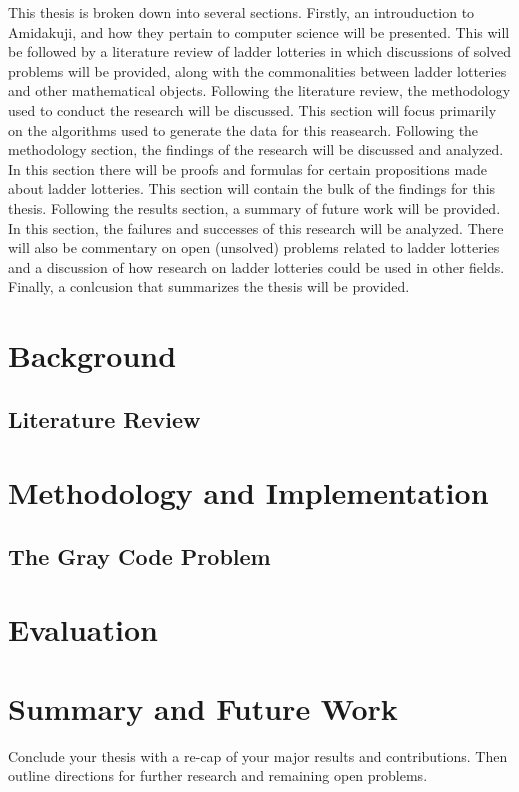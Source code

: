 This thesis is broken down into several sections. Firstly, an introuduction to Amidakuji, 
and how they pertain to computer science will be presented. This will be followed by a literature 
review of ladder lotteries in which discussions of solved problems will be 
provided, along with the commonalities between ladder lotteries and 
other mathematical objects. Following the literature review, the methodology
used to conduct the research will be discussed. This section will focus 
primarily on the algorithms used to generate the data for this reasearch. 
Following the methodology section, the findings of the research will be discussed and analyzed. 
In this section there will be proofs and formulas for certain propositions made about ladder 
lotteries. This section will contain the bulk of the findings for this thesis.
Following the results section, a summary of future work will be provided. In this section,
the failures and successes of this research will be analyzed. There will also be commentary on 
open (unsolved) problems related to ladder lotteries and a 
discussion of how research on ladder lotteries could be used in other fields.
Finally, a conlcusion that summarizes the thesis will be provided.

\chapter{Background}
\label{chapter:background}
 


\section{Literature Review}


\chapter{Methodology and Implementation}  
\label{chapter:methodology}
\section{The Gray Code Problem}


%
%


\chapter{Evaluation}  
\label{chapter:evaluation}



\chapter{Summary and Future Work}
\label{chapter:summary}

Conclude your thesis with a re-cap of your major results and contributions.  Then outline directions for further research and remaining open problems.
